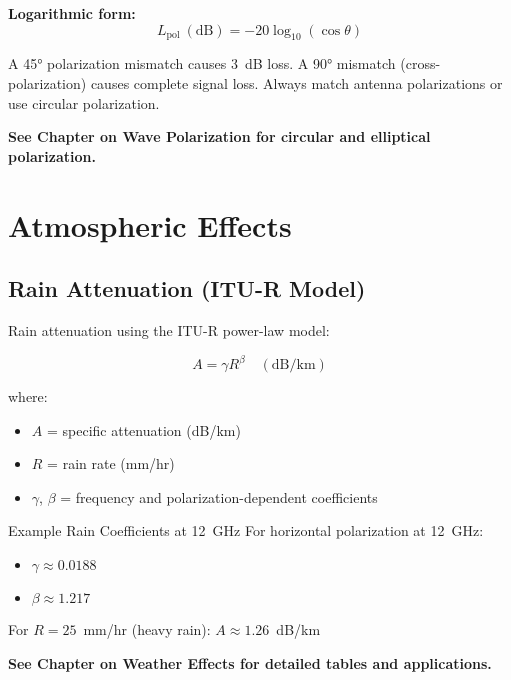 \textbf{Logarithmic form:}
\begin{equation}
\label{eq:polarization-loss-db}
L_{\text{pol}}\ (\text{dB}) = -20\log_{10}(\cos\theta)
\end{equation}

\begin{warningbox}
A 45° polarization mismatch causes 3~dB loss. A 90° mismatch (cross-polarization) causes complete signal loss. Always match antenna polarizations or use circular polarization.
\end{warningbox}

\textbf{See Chapter on Wave Polarization for circular and elliptical polarization.}

\section{Atmospheric Effects}
\label{sec:atmospheric-effects}

\subsection{Rain Attenuation (ITU-R Model)}
\label{subsec:rain-attenuation}

Rain attenuation using the ITU-R power-law model:

\begin{equation}
\label{eq:rain-attenuation}
A = \gamma R^{\beta} \quad (\text{dB/km})
\end{equation}

where:
\begin{itemize}
\item $A$ = specific attenuation (dB/km)
\item $R$ = rain rate (mm/hr)
\item $\gamma$, $\beta$ = frequency and polarization-dependent coefficients
\end{itemize}

\begin{calloutbox}{Example Rain Coefficients at 12~GHz}
For horizontal polarization at 12~GHz:
\begin{itemize}
\item $\gamma \approx 0.0188$
\item $\beta \approx 1.217$
\end{itemize}
For $R = 25$~mm/hr (heavy rain): $A \approx 1.26$~dB/km
\end{calloutbox}

\textbf{See Chapter on Weather Effects for detailed tables and applications.}

